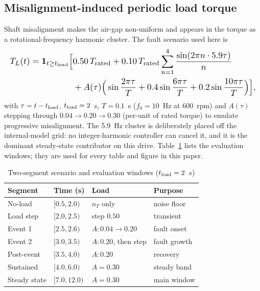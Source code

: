 \documentclass[journal]{IEEEtran}
\theoremstyle{remark}
\begin{document}
\subsection{Misalignment-induced periodic load torque}
Shaft misalignment makes the air-gap non-uniform and appears in the torque as a
rotational-frequency harmonic cluster. The fault scenario used here is
\begin{equation}
\begin{aligned}
\resizebox{\columnwidth}{!}{$\displaystyle
\begin{aligned}
T_L(t)=\mathbf 1_{t\ge t_{\rm load}}\Big[&0.50\,T_{\rm rated}
+0.10\,T_{\rm rated}\sum_{n=1}^{4}\frac{\sin(2\pi n\cdot 5.9\tau)}{n}\\
&+A(\tau)\Big(\sin\frac{2\pi\tau}{T}+0.4\sin\frac{6\pi\tau}{T}+0.2\sin\frac{10\pi\tau}{T}\Big)\Big],
\end{aligned}$}
\end{aligned}
\label{eq:dist}
\end{equation}
with $\tau=t-t_{\rm load}$, $t_{\rm load}=2$~s, $T=0.1$~s ($f_0=10$~Hz at 600~rpm)
and $A(\tau)$ stepping through $0.04\to0.20\to0.30$ (per-unit of rated torque) to
emulate progressive misalignment. The 5.9~Hz cluster is deliberately placed off the
internal-model grid: no integer-harmonic controller can cancel it, and it is the
dominant steady-state contributor on this drive. Table~\ref{tab:scenario} lists the
evaluation windows; they are used for every table and figure in this paper.

\begin{table}[!t]
\centering
\caption{Two-segment scenario and evaluation windows ($t_{\rm load}=2$~s)}
\label{tab:scenario}
\footnotesize
\begin{tabular}{@{}llll@{}}
\toprule
Segment & Time (s) & Load & Purpose\\
\midrule
No-load      & $[0.5,2.0)$  & $n_T$ only            & noise floor\\
Load step    & $[2.0,2.5)$  & step $0.50$           & transient\\
Event 1      & $[2.5,2.6)$  & $A:0.04\to0.20$       & fault onset\\
Event 2      & $[3.0,3.5)$  & $A:0.20$, then step   & fault growth\\
Post-event   & $[3.5,4.0)$  & $A:0.20$              & recovery\\
Sustained    & $[4.0,6.0)$  & $A=0.30$              & steady band\\
Steady state & $[7.0,12.0)$ & $A=0.30$              & main window\\
\bottomrule
\end{tabular}
\end{table}
\end{document}
